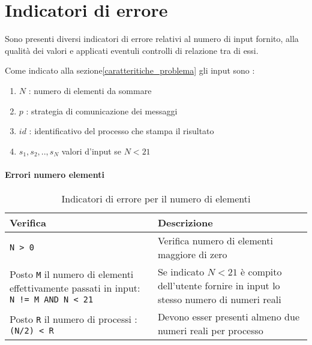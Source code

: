 \documentclass[a4paper,11pt]{book}
\begin{document}
\chapter{Indicatori di errore}\label{indicatori_errore}
Sono presenti diversi indicatori di errore relativi al numero di input fornito, alla qualità dei valori e applicati eventuli controlli di relazione tra di essi. \par 
Come indicato alla sezione\ref{caratteritiche_problema} gli input sono :
\begin{enumerate}
    \item $N$ : numero di elementi da sommare
    \item $p$ : strategia di comunicazione dei messaggi
    \item $id$ : identificativo del processo che stampa il risultato
    \item $s_1,s_2,..,s_N$ valori d'input se $N < 21$ 
\end{enumerate}

\subsubsection{Errori numero elementi}
\begin{table}[H]
    \begin{tabular}{| p{} | p{} |}
        \hline
        \rowcolor{header}
        \textbf{Verifica} & \textbf{Descrizione} \\
        \hline
        \verb|N > 0| & 
        Verifica numero di elementi maggiore di zero \\
        \hline
        Posto \verb|M| il numero di elementi effettivamente passati in input: \verb|N != M AND N < 21| & 
        Se indicato $N < 21$ è compito dell'utente fornire in input lo stesso numero di numeri reali \\
        \hline
        Posto \verb|R| il numero di processi
        : \verb|(N/2) < R| & 
        Devono esser presenti almeno due numeri reali per processo\\
        \hline
    \end{tabular}
    \caption{Indicatori di errore per il numero di elementi}
    \label{tab:Indicatori di errore per il numero di elementi}
\end{table}
\end{document}
